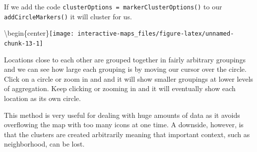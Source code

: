 \documentclass[
  12pt,
]{book}
\newenvironment{Shaded}{\begin{snugshade}}{\end{snugshade}}
\newcommand{\DataTypeTok}[1]{\textcolor[rgb]{0.13,0.29,0.53}{#1}}
\newcommand{\DecValTok}[1]{\textcolor[rgb]{0.00,0.00,0.81}{#1}}
\newcommand{\KeywordTok}[1]{\textcolor[rgb]{0.13,0.29,0.53}{\textbf{#1}}}
\newcommand{\NormalTok}[1]{#1}
\newcommand{\OperatorTok}[1]{\textcolor[rgb]{0.81,0.36,0.00}{\textbf{#1}}}
\newcommand{\StringTok}[1]{\textcolor[rgb]{0.31,0.60,0.02}{#1}}
\begin{document}
If we add the code \texttt{clusterOptions\ =\ markerClusterOptions()} to our \texttt{addCircleMarkers()} it will cluster for us.

\begin{Shaded}
\end{Shaded}

\textbackslash begin\{center\}\texttt{[image: interactive-maps\_files/figure-latex/unnamed-chunk-13-1]}

Locations close to each other are grouped together in fairly arbitrary groupings and we can see how large each grouping is by moving our cursor over the circle. Click on a circle or zoom in and and it will show smaller groupings at lower levels of aggregation. Keep clicking or zooming in and it will eventually show each location as its own circle.

This method is very useful for dealing with huge amounts of data as it avoids overflowing the map with too many icons at one time. A downside, however, is that the clusters are created arbitrarily meaning that important context, such as neighborhood, can be lost.
\end{document}
